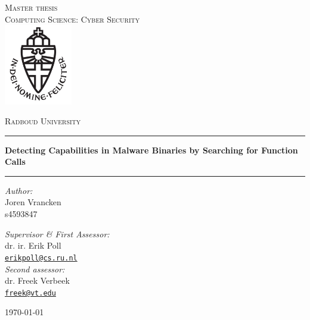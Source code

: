 \documentclass[11pt,a4paper]{report}
\begin{document}
\begin{titlepage}
	\begin{center}
		\textsc{\LARGE Master thesis\\Computing Science: Cyber Security}\\[1.5cm]
		\includegraphics[height=100pt]{resources/images/logo}

		\vspace{0.4cm}
		\textsc{\Large Radboud University}\\[1cm]
		\hrule
		\vspace{0.4cm}
		\textbf{\huge Detecting Capabilities in Malware Binaries by Searching for Function Calls}\\[0.4cm]
		\hrule
		\vspace{2cm}

		\begin{minipage}[t]{0.45\textwidth}
			\begin{flushleft}
				\large
				\textit{Author:}\\ Joren Vrancken\\ s4593847
			\end{flushleft}
		\end{minipage}
		\begin{minipage}[t]{0.45\textwidth}
			\begin{flushright}
				\large \textit{Supervisor \& First Assessor:}\\ dr. ir. Erik Poll\\ \href{mailto:erikpoll@cs.ru.nl}{\texttt{erikpoll@cs.ru.nl}}\\[1.3cm]
				\textit{Second assessor:}\\ dr. Freek Verbeek\\ \href{mailto:freek@vt.edu}{\texttt{freek@vt.edu}}
			\end{flushright}
		\end{minipage}
	\vfill
	{\large \today}
	\end{center}
\end{titlepage}


\thispagestyle{empty}


\end{document}
